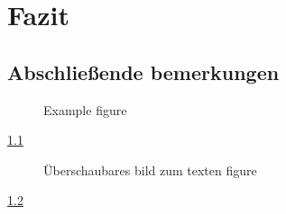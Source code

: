 \chapter{Fazit}
\section{Abschließende bemerkungen}
\begin{figure}[ht]
  \centering
  \caption{Example figure}
  \label{fig:example5} %
\end{figure}

\cref{fig:example5}


\begin{figure}[ht]
  \centering
  \caption{Überschaubares bild zum texten figure}
  \label{fig:example6} %
\end{figure}

\cref{fig:example6}

